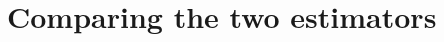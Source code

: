 \documentclass[journal]{../bib/IEEEtran}
\begin{document}

\section{Comparing the two estimators}\label{sec:comparingestimatorcircmean}
\end{document}
